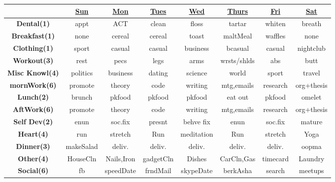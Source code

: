 \begin{frame}
\begin{table}[h!]
  \begin{center}
    \small
    \begin{tabular}{ | c || c || c || c || c || c || c || c ||}
      \hline 
      & \underline{Sun} & \underline{Mon} & \underline{Tues} & \underline{Wed} & \underline{Thurs} & \underline{Fri} & \underline{Sat} \\ 
      \hline
      \tiny \textbf{Dental(1)}  &  \tiny appt & \tiny ACT & \tiny clean & \tiny floss  & \tiny tartar  & \tiny whiten & \tiny breath \\ 
      \hline
      \tiny \textbf{Breakfast(1)}  &  \tiny none & \tiny cereal & \tiny cereal & \tiny toast  & \tiny maltMeal  & \tiny waffles & \tiny none \\ 
      \hline
      \tiny \textbf{Clothing(1)}  &  \tiny sport & \tiny casual & \tiny casual & \tiny business & \tiny bcasual & \tiny casual & \tiny nightclub \\
      \hline
      \tiny \textbf{Workout(3)} & \tiny rest & \tiny pecs & \tiny legs  & \tiny arms  & \tiny wrsts/shlds  & \tiny abs  & \tiny butt \\ 
      \hline 
      \tiny \textbf{Misc Knowl(4)} & \tiny politics  & \tiny business & \tiny dating & \tiny science  & \tiny world & \tiny sport & \tiny travel \\ 
      \hline
      \tiny \textbf{mornWork(6)} & \tiny promote  & \tiny theory & \tiny code & \tiny writing  & \tiny mtg,emails & \tiny research  & \tiny org+thesis \\  
      \hline
      \tiny \textbf{Lunch(2)}  &  \tiny brunch & \tiny pkfood & \tiny pkfood & \tiny pkfood  & \tiny eat out & \tiny pkfood  & \tiny omelet \\ 
      \hline
      \tiny \textbf{AftWork(6)} & \tiny promote  & \tiny theory & \tiny code & \tiny writing  & \tiny mtg,emails & \tiny research  & \tiny org+thesis \\ 
      \hline
      \tiny \textbf{Self Dev(2)} & \tiny enun & \tiny soc.fix  & \tiny presnt & \tiny behve fix & \tiny enun  & \tiny soc.fix & \tiny mature \\ 
      \hline 
      \tiny \textbf{Heart(4)} & \tiny run  & \tiny stretch  & \tiny Run & \tiny meditation  & \tiny Run & \tiny stretch  & \tiny Yoga \\ 
      \hline
      \tiny \textbf{Dinner(3)}  & \tiny makeSalad & \tiny deliv. & \tiny deliv. & \tiny deliv.  & \tiny deliv.  & \tiny deliv. & \tiny oopma \\  
      \hline 
      \tiny \textbf{Other(4)} & \tiny HouseCln & \tiny Nails,Iron & \tiny gadgetCln & \tiny Dishes & \tiny CarCln,Gas & \tiny timecard & \tiny Laundry \\ 
      \hline 
      \tiny \textbf{Social(6)} & \tiny fb & \tiny speedDate & \tiny frndMail & \tiny skypeDate  & \tiny berkAsha & \tiny search  & \tiny meetups \\ 
      \hline 
    \end{tabular}
  \end{center}

\end{table}
\end{frame} 
